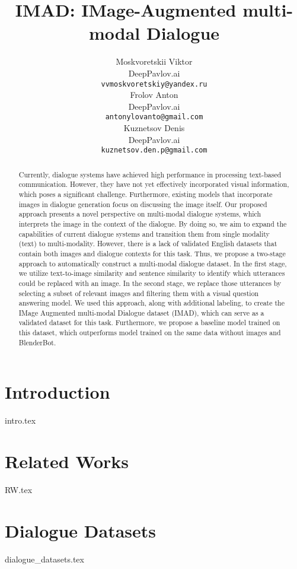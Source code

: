 \documentclass{article}
\title{IMAD: IMage-Augmented multi-modal Dialogue
}
\author{
  Moskvoretskii Viktor \\
  DeepPavlov.ai \\
  \texttt{vvmoskvoretskiy@yandex.ru} \\
   \And
  Frolov Anton \\
  DeepPavlov.ai \\
  \texttt{antonylovanto@gmail.com} \\
  \And
  Kuznetsov Denis \\
  DeepPavlov.ai \\
  \texttt{kuznetsov.den.p@gmail.com} \\
}
\begin{document}
\maketitle


\begin{abstract}
  Currently, dialogue systems have achieved high performance in processing text-based communication. However, they have not yet effectively incorporated visual information, which poses a significant challenge. Furthermore, existing models that incorporate images in dialogue generation focus on discussing the image itself. Our proposed approach presents a novel perspective on multi-modal dialogue systems, which interprets the image in the context of the dialogue. By doing so, we aim to expand the capabilities of current dialogue systems and transition them from single modality (text) to multi-modality. However, there is a lack of validated English datasets that contain both images and dialogue contexts for this task. Thus, we propose a two-stage approach to automatically construct a multi-modal dialogue dataset. In the first stage, we utilize text-to-image similarity and sentence similarity to identify which utterances could be replaced with an image. In the second stage, we replace those utterances by selecting a subset of relevant images and filtering them with a visual question answering model. We used this approach, along with additional labeling, to create the IMage Augmented multi-modal Dialogue dataset (IMAD), which can serve as a validated dataset for this task. Furthermore, we propose a baseline model trained on this dataset, which outperforms model trained on the same data without images and BlenderBot.
\end{abstract}




\section{Introduction}
{intro.tex}

\section{Related Works}
{RW.tex}

\section{Dialogue Datasets}
{dialogue_datasets.tex}
\end{document}
